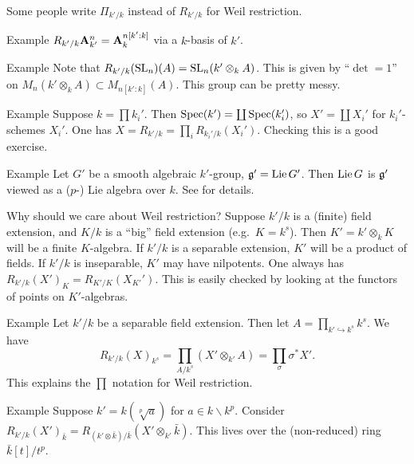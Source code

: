 Some people write $\Pi_{k'/k}$ instead of $R_{k'/k}$ for Weil restriction. 

\begin{enonce}[remark]{Example}
$R_{k'/k} \mathbf{A}_{k'}^n = \mathbf{A}_k^{n[k':k]}$ via a $k$-basis of $k'$. 
\end{enonce}

\begin{enonce}[remark]{Example}
Note that $R_{k'/k}(\operatorname{SL}_n)(A)=\operatorname{SL}_n(k'\otimes_k A)$. 
This is given by ``$\det=1$'' on $M_n(k'\otimes_k A) \subset M_{n[k':k]}(A)$. 
This group can be pretty messy. 
\end{enonce}

\begin{enonce}[remark]{Example}
Suppose $k=\prod k_i'$. Then $\operatorname{Spec}(k')=\coprod \operatorname{Spec}(k_i')$, so 
$X'=\coprod X_i'$ for $k_i'$-schemes $X_i'$. One has 
$X=R_{k'/k}=\prod_i R_{k_i'/k}(X_i')$. Checking this is a good exercise. 
\end{enonce}

\begin{enonce}[remark]{Example}
Let $G'$ be a smooth algebraic $k'$-group, $\mathfrak{g}'=\operatorname{Lie} G'$. Then 
$\operatorname{Lie} G$ is $\mathfrak{g}'$ viewed as a ($p$-) Lie algebra over $k$. See 
\cite[A.7.6, A.7.13]{cgp10} for details. 
\end{enonce}

Why should we care about Weil restriction? Suppose $k'/k$ is a (finite) 
field extension, and $K/k$ is a ``big'' field extension (e.g.~$K=k^s$). 
Then $K'=k'\otimes_k K$ will be a finite $K$-algebra. If $k'/k$ is a 
separable extension, $K'$ will be a product of fields. If $k'/k$ is 
inseparable, $K'$ may have nilpotents. One always has 
$R_{k'/k}(X')_K = R_{K'/K}(X_{K'}')$. This is easily checked by looking 
at the functors of points on $K'$-algebras.

\begin{enonce}[remark]{Example}
Let $k'/k$ be a separable field extension. Then let 
$A=\prod_{k'\hookrightarrow k^s} k^s$. We have 
\[
  R_{k'/k}(X)_{k^s} = \prod_{A/k^s} (X'\otimes_{k'} A) = \prod_\sigma \sigma^\ast X' .
\]
This explains the $\prod$ notation for Weil restriction. 
\end{enonce}

\begin{enonce}[remark]{Example}
Suppose $k'=k(\sqrt[p] a)$ for $a\in k\smallsetminus k^p$. Consider 
$R_{k'/k}(X')_{\bar k} = R_{(k'\otimes \bar k)/\bar k}(X'\otimes_{k'} \bar k)$. 
This lives over the (non-reduced) ring $\bar k[t]/t^p$. 
\end{enonce}

